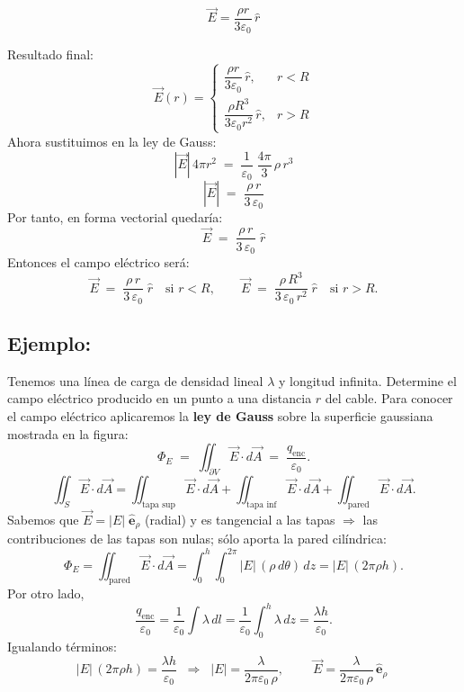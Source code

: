 \documentclass[a4paper,12pt]{article}
\begin{document}
\[
\boxed{\vec E = \frac{\rho r}{3\varepsilon_0}\,\hat r }
\]

\bigskip
\noindent
Resultado final:
\[
\vec E(r) =
\begin{cases}
\dfrac{\rho r}{3\varepsilon_0}\,\hat r, & r < R \\
\dfrac{\rho R^{3}}{3\varepsilon_0 r^{2}}\,\hat r, & r > R
\end{cases}
\]
\newpage
\noindent
Ahora sustituimos en la ley de Gauss:
\[
|\vec E|\,4\pi r^{2} \;=\; \frac{1}{\varepsilon_{0}}\;\frac{4\pi}{3}\,\rho\,r^{3}
\]
\[
|\vec E| \;=\; \frac{\rho\,r}{3\,\varepsilon_{0}}
\]
Por tanto, en forma vectorial quedaría:
\[
\vec E \;=\; \frac{\rho\,r}{3\,\varepsilon_{0}}\;\hat r
\]
Entonces el campo eléctrico será:
\[
\vec E \;=\; \frac{\rho\,r}{3\,\varepsilon_{0}}\;\hat r \quad \text{si } r<R,
\qquad
\vec E \;=\; \frac{\rho\,R^{3}}{3\,\varepsilon_{0}\,r^{2}}\;\hat r \quad \text{si } r>R.
\]
\subsection*{Ejemplo:}
\noindent
Tenemos una línea de carga de densidad lineal \(\lambda\) y longitud infinita.
Determine el campo eléctrico producido en un punto a una distancia \(r\) del cable. Para conocer el campo eléctrico aplicaremos la \textbf{ley de Gauss} sobre la superficie gaussiana mostrada en la figura:
\[
\Phi_{E} \;=\; \iint_{\partial V} \vec E\cdot d\vec A
\;=\; \frac{q_{\text{enc}}}{\varepsilon_{0}}.
\]
\[
\iint_{S}\vec E\!\cdot d\vec A
=\iint_{\text{tapa sup}}\vec E\!\cdot d\vec A
+\iint_{\text{tapa inf}}\vec E\!\cdot d\vec A
+\iint_{\text{pared}}\vec E\!\cdot d\vec A .
\]
Sabemos que \(\vec E=|\!E|\;\hat{\mathbf e}_\rho\) (radial) y es tangencial a las tapas \(\Rightarrow\)
las contribuciones de las tapas son nulas; sólo aporta la pared cilíndrica:
\[
\Phi_E=\iint_{\text{pared}} \vec E\!\cdot d\vec A
=\int_{0}^{h}\!\!\int_{0}^{2\pi} |\!E|\,(\rho\,d\theta)\,dz
=|\!E|\,(2\pi\rho h).
\]
Por otro lado,
\[
\frac{q_{\text{enc}}}{\varepsilon_0}
=\frac{1}{\varepsilon_0}\int \lambda\,dl
=\frac{1}{\varepsilon_0}\int_{0}^{h}\lambda\,dz
=\frac{\lambda h}{\varepsilon_0}.
\]
Igualando términos:
\[
|\!E|\,(2\pi\rho h)=\frac{\lambda h}{\varepsilon_0}
\;\;\Longrightarrow\;\;
|\!E|=\frac{\lambda}{2\pi\varepsilon_0\,\rho},
\qquad
\boxed{\;\vec E=\dfrac{\lambda}{2\pi\varepsilon_0\,\rho}\,\hat{\mathbf e}_\rho\;}
\]

\end{document}
